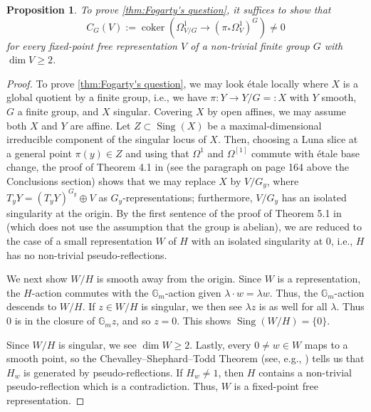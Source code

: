 \documentclass{amsart}
\newtheorem{proposition}[proposition]{Proposition}
\theoremstyle{definition}
\newcommand{\bG}{\mathbb{G}}
\DeclareMathOperator{\coker}{coker}
\DeclareMathOperator{\Sing}{Sing}
\begin{document}
\begin{proposition}\label{prop:reduction}
To prove \autoref{thm:Fogarty's question}, it suffices to show that
    \[
        C_G(V):=\coker\left(\Omega_{V/G}^1\longrightarrow(\pi_*\Omega_V^1)^G\right)\neq0
    \]
for every fixed-point free representation $V$ of a non-trivial finite group $G$ with $\dim V\geq2$.
\end{proposition}
\begin{proof}
    To prove \autoref{thm:Fogarty's question}, we may look \'etale locally where $X$ is a global quotient by a finite group, i.e., we have $\pi\colon Y\to Y/G=:X$ with $Y$ smooth, $G$ a finite group, and $X$ singular. Covering $X$ by open affines, we may assume both $X$ and $Y$ are affine. Let $Z\subset\Sing(X)$ be a maximal-dimensional irreducible component of the singular locus of $X$. Then, choosing a Luna slice at a general point $\pi(y)\in Z$ and using that $\Omega^1$ and $\Omega^{[1]}$ commute with \'etale base change, the proof of Theorem 4.1 in \cite{Jamet} (see the paragraph on page 164 above the Conclusions section) shows that we may replace $X$ by $V/G_y$, where $T_yY=(T_yY)^{G_y}\oplus V$ as $G_y$-representations; furthermore, $V/G_y$ has an isolated singularity at the origin. By the first sentence of the proof of Theorem 5.1 in \cite{Jamet} (which does not use the assumption that the group is abelian), we are reduced to the case of a small representation $W$ of $H$ with an isolated singularity at $0$, i.e., $H$ has no non-trivial pseudo-reflections.
    
    We next show $W/H$ is smooth away from the origin. Since $W$ is a representation, the $H$-action commutes with the $\bG_m$-action given $\lambda\cdot w=\lambda w$. Thus, the $\bG_m$-action descends to $W/H$. If $z\in W/H$ is singular, we then see $\lambda z$ is as well for all $\lambda$. Thus $0$ is in the closure of $\bG_m z$, and so $z=0$. This shows $\Sing(W/H)=\{0\}$.
    
    Since $W/H$ is singular, we see $\dim W\geq2$. Lastly, every $0\neq w\in W$ maps to a smooth point, so the Chevalley--Shephard--Todd Theorem (see, e.g., \cite[Remark 11.7]{Etingof2024}) tells us that $H_w$ is generated by pseudo-reflections. If $H_w\neq1$, then $H$ contains a non-trivial pseudo-reflection which is a contradiction. Thus, $W$ is a fixed-point free representation.
\end{proof}
\end{document}
